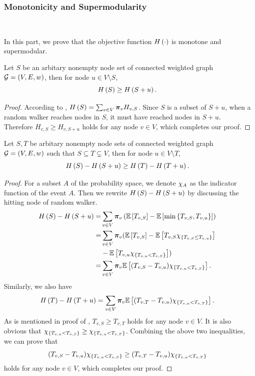 \documentclass[sigconf]{acmart}
\begin{document}
\subsubsection{Monotonicity and Supermodularity}

\

In this part, we prove that the objective function \(H\left(\cdot\right)\) is monotone and supermodular.
\begin{theorem}[Monotonicity]\label{thm:mono}
    Let \(S\) be an arbitary nonempty node set of connected weighted graph \(\mathcal{G}=(V,E,w)\), then for node \(u\in V\setminus S\),
    \[H\left(S\right)\ge H\left(S+u\right).\]
\end{theorem}

\begin{proof}
    According to , \(H\left(S\right)=\sum_{v\in V}\boldsymbol{\pi}_vH_{v,S}\).
    Since \(S\) is a subset of \(S+u\), when a random walker reaches nodes in \(S\), it must have reached nodes in \(S+u\). Therefore \(H_{v,S}\ge H_{v,S+u}\) holds for any node \(v\in V\), which completes our proof.
\end{proof}

\begin{theorem}[Supermodularity]\label{thm:supermod}
    Let \(S,T\) be arbitary nonempty node sets of connected weighted graph \(\mathcal{G}=(V,E,w)\) such that \(S\subseteq T\subsetneq V\), then for node \(u\in V\setminus T\),
    \[H\left(S\right)-H\left(S+u\right)\ge H\left(T\right)-H\left(T+u\right).\]
\end{theorem}

\begin{proof}
    For a subset \(A\) of the probability space, we denote \(\chi_{A}\) as the indicator function of the event \(A\). Then we rewrite \(H\left(S\right)-H\left(S+u\right)\) by discussing the hitting node of random walker.
    \begin{align*}
        H\left(S\right)-H\left(S+u\right)
        = & \sum_{v\in V}\boldsymbol{\pi}_v\left( \mathbb{E}\left[T_{v,S}\right]-\mathbb{E}\left[\min\left\{T_{v,S},T_{v,u} \right\}\right] \right)          \\
        = & \sum_{v\in V}\boldsymbol{\pi}_v(\mathbb{E}\left[T_{v,S}\right]-\mathbb{E}\left[T_{v,S}\chi_{\left\{T_{v,S}\le T_{v,u} \right\}}\right] \\
          & -\mathbb{E}\left[T_{v,u}\chi_{\left\{T_{v,u}<T_{v,S} \right\}}\right])                                       \\
        = & \sum_{v\in V}\boldsymbol{\pi}_v\mathbb{E}\left[(T_{v,S}-T_{v,u})\chi_{\left\{T_{v,u}<T_{v,S} \right\}}\right].
    \end{align*}
    Similarly, we also have
    \[H\left(T\right)-H\left(T+u\right)=\sum_{v\in V}\boldsymbol{\pi}_v\mathbb{E}\left[(T_{v,T}-T_{v,u})\chi_{\left\{T_{v,u}<T_{v,T} \right\}}\right].\]
    As is mentioned in proof of , \(T_{v,S}\ge T_{v,T}\) holds for any node \(v\in V\).
    It is also obvious that \(\chi_{\left\{T_{v,u}<T_{v,S} \right\}}\ge\chi_{\left\{T_{v,u}<T_{v,T} \right\}}\).
    Combining the above two inequalities, we can prove that
    \[(T_{v,S}-T_{v,u})\chi_{\left\{T_{v,u}<T_{v,S} \right\}}\ge(T_{v,T}-T_{v,u})\chi_{\left\{T_{v,u}<T_{v,T} \right\}}\]
    holds for any node \(v\in V\), which completes our proof.
\end{proof}
\end{document}
